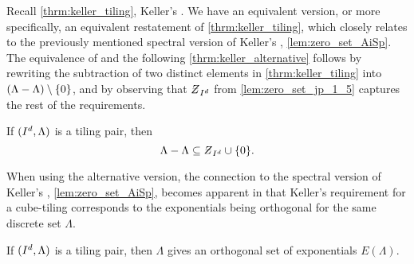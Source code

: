 \documentclass[../thesis.tex]{subfiles}
\begin{document}
  


Recall \cref{thrm:keller_tiling}, Keller's . We have an equivalent version, or more specifically, an equivalent restatement of \cref{thrm:keller_tiling}, which closely relates to the previously mentioned spectral version of Keller's , \cref{lem:zero_set_AiSp}. The equivalence of  and the following \cref{thrm:keller_alternative} follows by rewriting the subtraction of two distinct elements in \cref{thrm:keller_tiling} into $(\Lambda-\Lambda)\setminus\{0\}$, and by observing that $\Zstroke_{I^d}$ from \cref{lem:zero_set_jp_1_5} captures the rest of the requirements.

\begin{theorem}\label{thrm:keller_alternative}
    If $(I^d,\Lambda)$ is a tiling pair, then 
    \begin{equation*}
        \Lambda - \Lambda \subseteq \Zstroke_{I^d} \cup \braq{0}.
    \end{equation*} 
\end{theorem}

When using the alternative version, the connection to the spectral version of Keller's , \cref{lem:zero_set_AiSp}, becomes apparent in that Keller's requirement for a cube-tiling corresponds to the exponentials being orthogonal for the same discrete set $\Lambda$.

\begin{corollary}\label{cor:tiling_pair_implies_orthogonal}
    If $(I^d, \Lambda)$ is a tiling pair, then $\Lambda$ gives an orthogonal set of exponentials $E(\Lambda)$.
\end{corollary}
\end{document}
